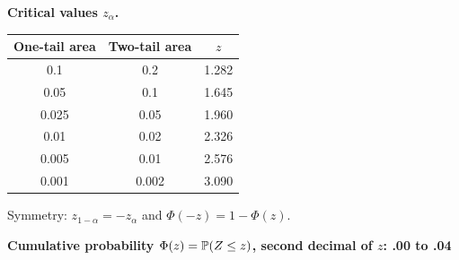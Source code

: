 \textbf{Critical values $z_\alpha$.}

\begin{center}
\small
\begin{tabular}{ccc}
\toprule
One-tail area & Two-tail area & $z$ \\
\midrule
0.1 & 0.2 & 1.282 \\
0.05 & 0.1 & 1.645 \\
0.025 & 0.05 & 1.960 \\
0.01 & 0.02 & 2.326 \\
0.005 & 0.01 & 2.576 \\
0.001 & 0.002 & 3.090 \\
\bottomrule
\end{tabular}
\end{center}

Symmetry: $z_{1-\alpha}=-z_\alpha$ and $\Phi(-z)=1-\Phi(z)$.

\textbf{Cumulative probability $\Phi(z)=\mathbb{P}(Z\le z)$, second decimal of $z$: .00 to .04}


